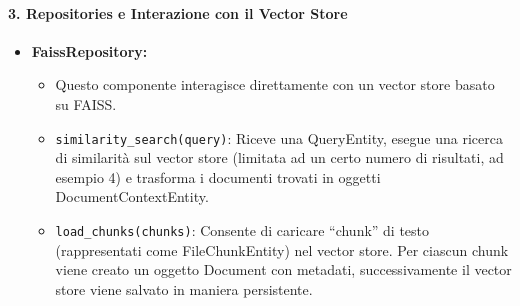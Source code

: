 \paragraph{3. Repositories e Interazione con il Vector Store}
\begin{itemize}
    \item \textbf{FaissRepository:}
    \begin{itemize}
        \item Questo componente interagisce direttamente con un vector store basato su FAISS.
        \item \texttt{similarity\_search(query)}: Riceve una QueryEntity, esegue una ricerca di similarità sul vector store (limitata ad un certo numero di risultati, ad esempio 4) e trasforma i documenti trovati in oggetti DocumentContextEntity.
        \item \texttt{load\_chunks(chunks)}: Consente di caricare “chunk” di testo (rappresentati come FileChunkEntity) nel vector store. Per ciascun chunk viene creato un oggetto Document con metadati, successivamente il vector store viene salvato in maniera persistente.
    \end{itemize}
\end{itemize}

